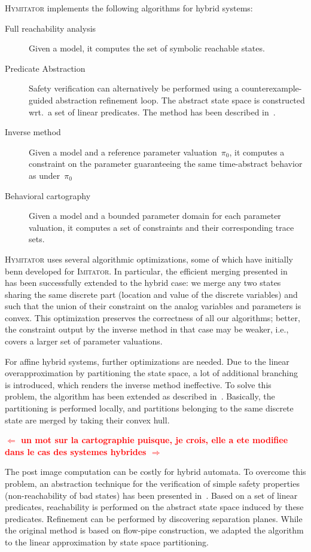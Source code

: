 \documentclass{llncs}
\newcommand{\pio}{\pi_0}
\newcommand{\imitator}{\textsc{Imitator}}
\newcommand{\hymitator}{\textsc{Hymitator}}
\newcommand{\commentaire}[1]{\textcolor{red}{\textbf{$\Leftarrow$  #1 $\Rightarrow$}}}
\begin{document}
\hymitator{} implements the following algorithms for hybrid systems:
\begin{description}
	\item[Full reachability analysis] Given a model, it computes the set of symbolic reachable states.
\item[Predicate Abstraction] Safety verification can alternatively be performed using a counterexample-guided abstraction refinement loop. The abstract state space is constructed wrt.~a set of linear predicates. The method has been described in~\cite{ADI2006}.
	\item[Inverse method] Given a model and a reference parameter valuation~$\pio$, it computes a constraint on the parameter guaranteeing the same time-abstract behavior as under~$\pio$
	\item[Behavioral cartography] Given a model and a bounded parameter domain for each parameter valuation, it computes a set of constraints and their corresponding trace sets.
\end{description}

\hymitator{} uses several algorithmic optimizations, some of which have initially benn developed for \imitator{}.
In particular, the efficient merging presented in~\cite{AFS12} has been successfully extended to the hybrid case: we merge any two states sharing the same discrete part (location and value of the discrete variables) and such that the union of their constraint on the analog variables and parameters is convex.
This optimization preserves the correctness of all our algorithms; better, the constraint output by the inverse method in that case may be weaker, i.e., covers a larger set of parameter valuations.

For affine hybrid systems, further optimizations are needed. Due to the linear overapproximation by partitioning the state space, a lot of additional branching is introduced, which renders the inverse method ineffective. To solve this problem, the algorithm has been extended as described in~\cite{FK11}. Basically, the partitioning is performed locally, and partitions belonging to the same discrete state are merged by taking their convex hull. 

\commentaire{un mot sur la cartographie puisque, je crois, elle a ete modifiee dans le cas des systemes hybrides}

The post image computation can be costly for hybrid automata. To overcome this problem, an abstraction technique for the verification of simple safety  properties (non-reachability of bad states) has been presented in~\cite{ADI2006}. Based on a set of linear predicates, reachability is performed on the abstract state space induced by these predicates. Refinement can be performed by discovering separation planes. While the original method is based on flow-pipe construction, we adapted the algorithm to the linear approximation by state space partitioning. 
\end{document}
